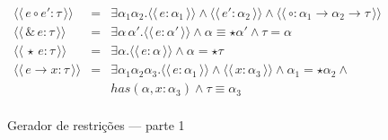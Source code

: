 \documentclass[a4paper,8pt]{article}
\newcommand{\constr}[1]{\ensuremath{\langle\langle\,#1\,\rangle\rangle}}
\begin{document}
\begin{figure}[h]
\[{\begin{array}{lcl}
                     \constr{e \circ e' : \tau} & = & \exists
                                                      \alpha_1\alpha_2.\constr{e
                                                      :\alpha_1} \land
                                                      \constr{e' :
                                                      \alpha_2} \land
                                                      \constr{\circ :
                                                      \alpha_1\to\alpha_2\to\tau}\\
                     \constr{\&\,e : \tau} & = & \exists \alpha\,
                                                 \alpha'. \constr{e :
                                                 \alpha'} \land
                                                 \alpha \equiv \star \alpha'
                                                 \land \tau = \alpha\\
                     \constr{\star\,e : \tau} & = & \exists
                                                    \alpha. \constr{e
                                                    : \alpha} \land
                                                    \alpha = \star \tau\\
                     \constr{e\to x : \tau} & = & \exists
                                                  \alpha_1\alpha_2\alpha_3. \constr{e
                                                  :\alpha_1} \land
                                                  \constr{x :
                                                  \alpha_3} \land
                                                  \alpha_1 = \star\alpha_2
                                                  \land\\
                          & & has(\alpha,x : \alpha_3) \land \tau
                              \equiv \alpha_3\\
            \end{array}}
       \]
       \centering
       \caption{Gerador de restrições --- parte 1}
       \label{figgen}
     \end{figure}
\end{document}
